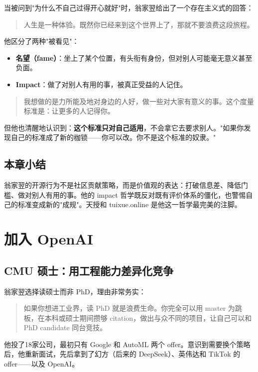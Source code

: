\documentclass[a4paper]{article}
\begin{document}
当被问到"为什么不自己过得开心就好"时，翁家翌给出了一个存在主义式的回答：

\begin{quote}
人生是一种体验。既然你已经来到这个世界上了，那就不要浪费这段旅程。
\end{quote}

他区分了两种"被看见"：
\begin{itemize}
\item \textbf{名望（fame）}：坐上了某个位置，有头衔有身份，但对别人可能毫无意义甚至负面。
\item \textbf{Impact}：做了对别人有用的事，被真正受益的人记住。
\end{itemize}

\begin{quote}
我想做的是力所能及地对身边的人好，做一些对大家有意义的事。这个度量标准是：让更多的人记得你。
\end{quote}

但他也清醒地认识到：\textbf{这个标准只对自己适用}，不会拿它去要求别人。"如果你发现自己的标准成了新的枷锁——你可以改。你不是这个标准的奴隶。"

\subsection{本章小结}
翁家翌的开源行为不是社区贡献策略，而是价值观的表达：打破信息差、降低门槛、做对别人有用的事。他的 impact 哲学既反对既有评价体系的僵化，也警惕自己的标准变成新的"成规"。天授和 tuixue.online 是他这一哲学最完美的注脚。

\section{加入 OpenAI}

\subsection{CMU 硕士：用工程能力差异化竞争}

翁家翌选择读硕士而非 PhD，理由非常务实：

\begin{quote}
如果你想进工业界，读 PhD 就是浪费生命。你完全可以用 master 为跳板，在本科或硕士期间攒够 citation，做出与众不同的项目，让自己可以和 PhD candidate 同台竞技。
\end{quote}

他投了18家公司，最初只有 Google 和 AutoML 两个 offer。意识到需要换个策略后，他重新面试，先后拿到了幻方（后来的 DeepSeek）、英伟达和 TikTok 的 offer——以及 OpenAI。
\end{document}
